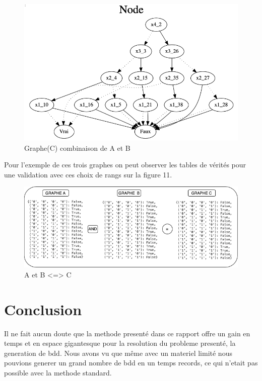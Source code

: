 \documentclass[french]{article}
\begin{document}
\begin{figure}[h!]
    \centering
    \includegraphics[scale=0.4]{abr_melding_C.png}
    \caption{Graphe(C) combinaison de A et B}
    \label{fig:graphe_B}
\end{figure}

Pour l'exemple de ces trois graphes on peut observer les tables de vérités pour une validation avec ces choix de rangs sur la figure 11.

\begin{figure}[h!]
    \centering
    \includegraphics[scale=0.5]{and_ABC.png}
    \caption{A et B <=> C}
    \label{fig:and_abc}
\end{figure}
 \newpage

\section{Conclusion}
Il ne fait aucun doute que la methode presenté dans ce rapport offre un gain en temps et en espace gigantesque pour la resolution du probleme presenté, la generation de bdd. Nous avons vu que même avec un materiel limité nous pouvions generer un grand nombre de bdd en un temps records, ce qui n'etait pas possible avec la methode standard. 
\end{document}
